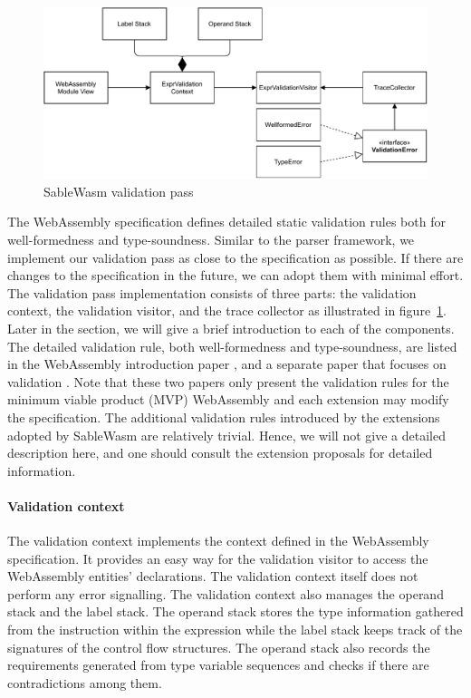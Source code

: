 \begin{figure}
  \centering
  \includegraphics[width=\textwidth]{Images/sablewasm-validation.pdf}
  \caption{SableWasm validation pass}
  \label{fig:sablewasm-validation}
\end{figure}

The WebAssembly specification defines detailed static validation rules both for
well-formedness and type-soundness. Similar to the parser framework, we
implement our validation pass as close to the specification as possible. If
there are changes to the specification in the future, we can adopt them with
minimal effort. The validation pass implementation consists of three parts:
the validation context, the validation visitor, and the trace collector as
illustrated in figure~\ref{fig:sablewasm-validation}. Later in the section,
we will give a brief introduction to each of the components. The detailed
validation rule, both well-formedness and type-soundness, are listed in the
WebAssembly introduction paper \cite{10.1145/3062341.3062363}, and a separate
paper that focuses on validation \cite{10.1145/3167082}. Note that these two
papers only present the validation rules for the minimum viable product (MVP)
WebAssembly and each extension may modify the specification. The additional
validation rules introduced by the extensions adopted by SableWasm are
relatively trivial. Hence, we will not give a detailed description here, and one
should consult the extension proposals for detailed information.

\paragraph{Validation context}
The validation context implements the context defined in the WebAssembly
specification. It provides an easy way for the validation visitor to access the
WebAssembly entities' declarations. The validation context itself does not
perform any error signalling. The validation context also manages the operand
stack and the label stack. The operand stack stores the type information
gathered from the instruction within the expression while the label stack keeps
track of the signatures of the control flow structures. The operand stack also
records the requirements generated from type variable sequences and checks if
there are contradictions among them.

